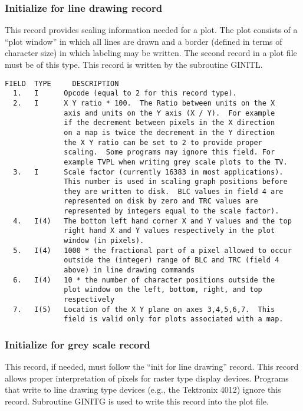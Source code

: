 \subsubsection{Initialize for line drawing record}
This record provides scaling information needed for a plot. The plot
consists of a ``plot window'' in which all lines are drawn and a border
(defined in terms of character size) in which labeling may be written.
The second record in a plot file must be of this type.  This record is
written by the subroutine GINITL.

\begin{verbatim}
FIELD  TYPE     DESCRIPTION
  1.   I      Opcode (equal to 2 for this record type).
  2.   I      X Y ratio * 100.  The Ratio between units on the X
              axis and units on the Y axis (X / Y).  For example
              if the decrement between pixels in the X direction
              on a map is twice the decrement in the Y direction
              the X Y ratio can be set to 2 to provide proper
              scaling.  Some programs may ignore this field. For
              example TVPL when writing grey scale plots to the TV.
  3.   I      Scale factor (currently 16383 in most applications).
              This number is used in scaling graph positions before
              they are written to disk.  BLC values in field 4 are
              represented on disk by zero and TRC values are
              represented by integers equal to the scale factor).
  4.   I(4)   The bottom left hand corner X and Y values and the top
              right hand X and Y values respectively in the plot
              window (in pixels).
  5.   I(4)   1000 * the fractional part of a pixel allowed to occur
              outside the (integer) range of BLC and TRC (field 4
              above) in line drawing commands
  6.   I(4)   10 * the number of character positions outside the
              plot window on the left, bottom, right, and top
              respectively
  7.   I(5)   Location of the X Y plane on axes 3,4,5,6,7.  This
              field is valid only for plots associated with a map.

\end{verbatim}
\subsubsection{Initialize for grey scale record}
This record, if needed, must follow the ``init for line drawing''
record.  This record allows proper interpretation of pixels for raster
type display devices.  Programs that write to line drawing type
devices (e.g., the Tektronix 4012) ignore this record. Subroutine
GINITG is used to write this record into the plot file.

